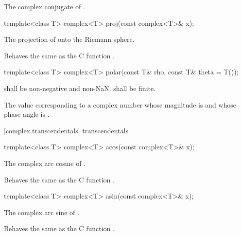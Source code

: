 \begin{itemdescr}
\pnum
\returns
The complex conjugate of .
\end{itemdescr}

%
\begin{itemdecl}
template<class T> complex<T> proj(const complex<T>& x);
\end{itemdecl}

\begin{itemdescr}
\pnum
\returns The projection of  onto the Riemann sphere.

\pnum
\remarks
Behaves the same as the C function .
\end{itemdescr}

%
\begin{itemdecl}
template<class T> complex<T> polar(const T& rho, const T& theta = T());
\end{itemdecl}

\begin{itemdescr}
\pnum
\requires
{} shall be non-negative and non-NaN.  shall be finite.

\pnum
\returns
The
value corresponding
to a complex number whose magnitude is  and whose phase angle
is .
\end{itemdescr}

[complex.transcendentals]{ transcendentals}

%
%
\begin{itemdecl}
template<class T> complex<T> acos(const complex<T>& x);
\end{itemdecl}

\begin{itemdescr}
\pnum
\returns The complex arc cosine of .

\pnum
\remarks
Behaves the same as the C function .
\end{itemdescr}

%
%
\begin{itemdecl}
template<class T> complex<T> asin(const complex<T>& x);
\end{itemdecl}

\begin{itemdescr}
\pnum
\returns The complex arc sine of .

\pnum
\remarks
Behaves the same as the C function .
\end{itemdescr}

